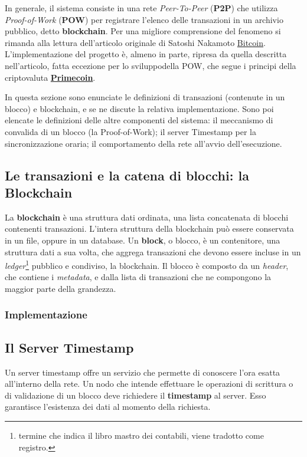 In generale, il sistema consiste in una rete \textit{Peer-To-Peer} (\textbf{P2P}) che utilizza \textit{Proof-of-Work} (\textbf{POW}) per registrare l'elenco delle transazioni in un archivio pubblico, detto \textbf{blockchain}. Per una migliore comprensione del fenomeno si rimanda alla lettura dell'articolo originale di Satoshi Nakamoto \href{https://bitcoin.org/bitcoin.pdf}{Bitcoin}. 
L'implementazione del progetto è, almeno in parte, ripresa da quella descritta nell'articolo, fatta eccezione per lo sviluppodella POW, che segue i principi della criptovaluta \href{http://primecoin.io/bin/primecoin-paper.pdf}{\textbf{Primecoin}}.

In questa sezione sono enunciate le definizioni di transazioni (contenute in un blocco) e blockchain, e se ne discute la relativa implementazione. Sono poi elencate le definizioni delle altre componenti del sistema: il meccanismo di convalida di un blocco (la Proof-of-Work); il server Timestamp per la sincronizzazione oraria; il comportamento della rete all'avvio dell'esecuzione.

\subsection{Le transazioni e la catena di blocchi: la Blockchain}
La \textbf{blockchain} è una struttura dati ordinata, una lista concatenata di blocchi contenenti transazioni. L'intera struttura della blockchain può essere conservata in un file, oppure in un database. Un \textbf{block}, o blocco, è un contenitore, una struttura dati a sua volta, che aggrega transazioni che devono essere incluse in un \textit{ledger}\footnote{termine che indica il libro mastro dei contabili, viene tradotto come registro.} pubblico e condiviso, la blockchain. 
Il blocco è composto da un \textit{header}, che contiene i \textit{metadata}, e dalla lista di transazioni che ne compongono la maggior parte della grandezza.

\subsubsection{Implementazione}

\subsection{Il Server Timestamp}
Un server timestamp offre un servizio che permette di conoscere l'ora esatta all'interno della rete. Un nodo che intende effettuare le operazioni di scrittura o di validazione di un blocco deve richiedere il \textbf{timestamp} al server. Esso garantisce l'esistenza dei dati al momento della richiesta.

